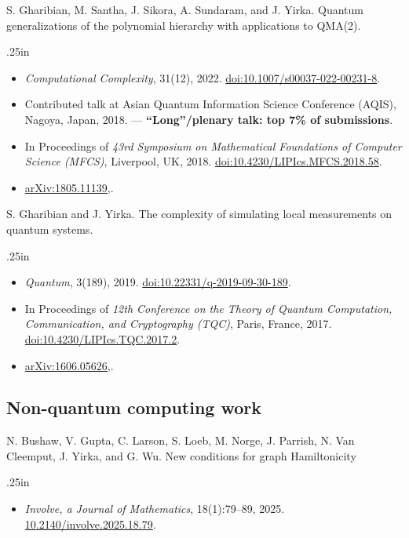 \documentclass[11pt,letterpaper,serif]{moderncv}
\newcommand{\pubItemSep}{0em}
\begin{document}
S. Gharibian, M. Santha, J. Sikora, A. Sundaram, and J. Yirka.\quad
Quantum generalizations of the polynomial hierarchy with applications to QMA(2).
\begin{adjustwidth}{.25in}{}
	\begin{itemize}
		\item[--] \textit{Computational Complexity}, 31(12), 2022.\quad
		\href{https://doi.org/10.1007/s00037-022-00231-8}{doi:10.1007/s00037-022-00231-8}.
		\item Contributed talk at Asian Quantum Information Science Conference (AQIS), Nagoya, Japan, 2018. --- \textbf{``Long''/plenary talk: top 7\% of submissions}.
		\item In Proceedings of \textit{43rd Symposium on Mathematical Foundations of Computer Science (MFCS)}, Liverpool, UK, 2018. \quad
		\href{https://doi.org/10.4230/LIPIcs.MFCS.2018.58}{doi:10.4230/LIPIcs.MFCS.2018.58}.
		\item[--] \href{https://arxiv.org/abs/1805.11139}{arXiv:1805.11139},.
	\end{itemize}
\end{adjustwidth}
\medskip

S. Gharibian and J. Yirka.\quad
The complexity of simulating local measurements on quantum systems.
\begin{adjustwidth}{.25in}{}
	\begin{itemize}[itemsep=\pubItemSep]
		\item[--] \textit{Quantum}, 3(189), 2019. \quad
		\href{https://doi.org/10.22331/q-2019-09-30-189}{doi:10.22331/q-2019-09-30-189}.
		\item In Proceedings of \textit{12th Conference on the Theory of Quantum Computation, Communication,
		and Cryptography (TQC)}, Paris, France, 2017. \quad
		\href{https://doi.org/10.4230/LIPIcs.TQC.2017.2}{doi:10.4230/LIPIcs.TQC.2017.2}.
		\item[--] \href{https://arxiv.org/abs/1606.05626}{arXiv:1606.05626},.
	\end{itemize}
\end{adjustwidth}

\smallskip
\subsection{Non-quantum computing work}
N. Bushaw, V. Gupta, C. Larson, S. Loeb, M. Norge, J. Parrish, N. Van Cleemput, J. Yirka, and G. Wu.\quad
New conditions for graph Hamiltonicity
\begin{adjustwidth}{.25in}{}
	\begin{itemize}[itemsep=\pubItemSep]
		\item[--] \textit{Involve, a Journal of Mathematics}, 18(1):79--89, 2025.\quad
		\href{https://doi.org/10.2140/involve.2025.18.79}{10.2140/involve.2025.18.79}.
	\end{itemize}
\end{adjustwidth}
\medskip
\end{document}
